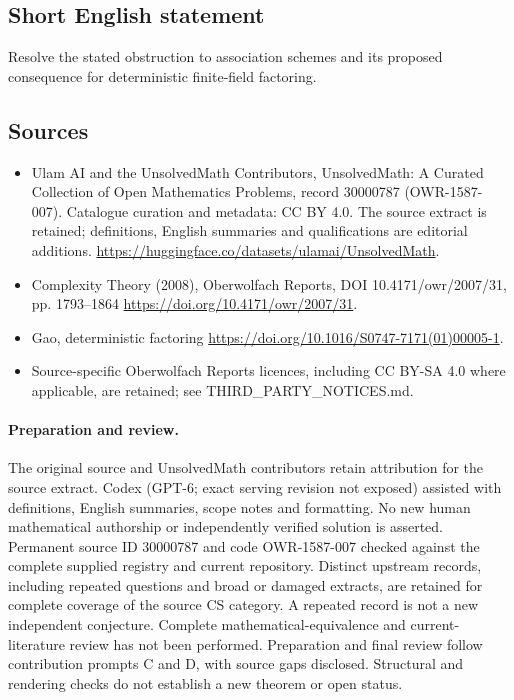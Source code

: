 \documentclass[11pt]{article}
\begin{document}
\subsection{Short English statement}
Resolve the stated obstruction to association schemes and its proposed consequence for deterministic finite-field factoring.
\subsection{Sources}
\begin{itemize}
\item[\hypertarget{source:30000787:1}{S1}] Ulam AI and the UnsolvedMath Contributors, UnsolvedMath: A Curated Collection of Open Mathematics Problems, record 30000787 (OWR-1587-007). Catalogue curation and metadata: CC BY 4.0. The source extract is retained; definitions, English summaries and qualifications are editorial additions.
\url{https://huggingface.co/datasets/ulamai/UnsolvedMath}.
\item[\hypertarget{source:30000787:2}{S2}] Complexity Theory (2008), Oberwolfach Reports, DOI 10.4171/owr/2007/31, pp. 1793--1864
\url{https://doi.org/10.4171/owr/2007/31}.
\item[\hypertarget{source:30000787:3}{S3}] Gao, deterministic factoring
\url{https://doi.org/10.1016/S0747-7171(01)00005-1}.
\item Source-specific Oberwolfach Reports licences, including CC BY-SA 4.0 where applicable, are retained; see THIRD\_PARTY\_NOTICES.md.
\end{itemize}
\paragraph{Preparation and review.}
The original source and UnsolvedMath contributors retain attribution for the source extract. Codex (GPT-6; exact serving revision not exposed) assisted with definitions, English summaries, scope notes and formatting. No new human mathematical authorship or independently verified solution is asserted. Permanent source ID 30000787 and code OWR-1587-007 checked against the complete supplied registry and current repository. Distinct upstream records, including repeated questions and broad or damaged extracts, are retained for complete coverage of the source CS category. A repeated record is not a new independent conjecture. Complete mathematical-equivalence and current-literature review has not been performed. Preparation and final review follow contribution prompts C and D, with source gaps disclosed. Structural and rendering checks do not establish a new theorem or open status.
\label{end:30000787}
\end{document}

